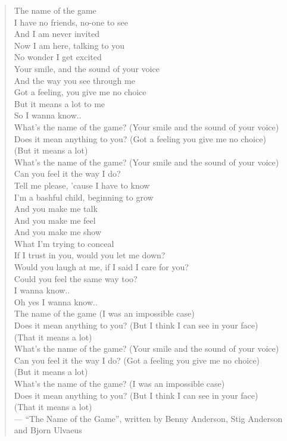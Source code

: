 \begin{quote}
The name of the game \\[1\baselineskip]

I have no friends, no-one to see \\
And I am never invited \\
Now I am here, talking to you \\
No wonder I get excited \\[1\baselineskip]

Your smile, and the sound of your voice \\
And the way you see through me \\
Got a feeling, you give me no choice \\
But it means a lot to me \\
So I wanna know.. \\[1\baselineskip]

What's the name of the game? (Your smile and the sound of your voice) \\
Does it mean anything to you? (Got a feeling you give me no choice) \\
(But it means a lot) \\
What's the name of the game? (Your smile and the sound of your voice) \\
Can you feel it the way I do? \\
Tell me please, 'cause I have to know \\
I'm a bashful child, beginning to grow \\[1\baselineskip]

And you make me talk \\
And you make me feel \\
And you make me show \\
What I'm trying to conceal \\
If I trust in you, would you let me down? \\
Would you laugh at me, if I said I care for you? \\
Could you feel the same way too? \\
I wanna know.. \\
Oh yes I wanna know.. \\[1\baselineskip]

The name of the game (I was an impossible case) \\
Does it mean anything to you? (But I think I can see in your face) \\
(That it means a lot) \\
What's the name of the game? (Your smile and the sound of your voice) \\
Can you feel it the way I do? (Got a feeling you give me no choice) \\
(But it means a lot) \\
What's the name of the game? (I was an impossible case) \\
Does it mean anything to you? (But I think I can see in your face) \\
(That it means a lot) \\
--- \enquote{The Name of the Game}, written by Benny Anderson, Stig Anderson and Bjorn Ulvaeus
\end{quote}
